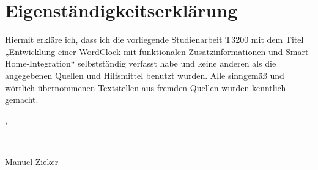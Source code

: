 
\chapter*{Eigenständigkeitserklärung}

Hiermit erkläre ich, dass ich die vorliegende
Studienarbeit T3200 mit dem Titel „Entwicklung einer WordClock mit funktionalen Zusatzinformationen und Smart-Home-Integration“ selbstständig verfasst habe und keine anderen als die angegebenen Quellen und Hilfsmittel benutzt wurden.
Alle sinngemäß und wörtlich übernommenen Textstellen aus fremden Quellen wurden kenntlich gemacht.

\releaseLocation, \releaseDate
\vspace{2em}

\rule{6cm}{0.4pt}\\
Manuel Zieker
